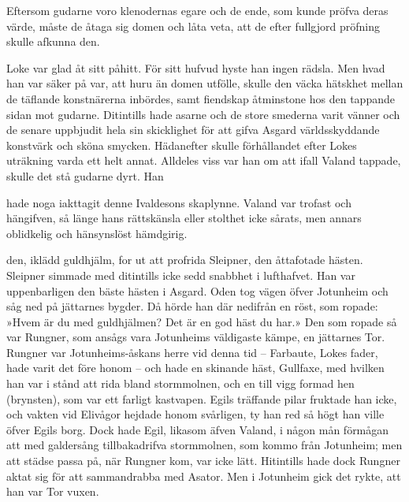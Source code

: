 Eftersom gudarne voro klenodernas egare och de ende, som kunde pröfva
deras värde, måste de åtaga sig domen och låta veta, att de efter
fullgjord pröfning skulle afkunna den.

Loke var glad åt sitt påhitt. För sitt hufvud hyste han ingen rädsla.
Men hvad han var säker på var, att huru än domen utfölle, skulle den
väcka hätskhet mellan de täflande konstnärerna inbördes, samt fiendskap
åtminstone hos den tappande sidan mot gudarne. Ditintills hade asarne
och de store smederna varit vänner och de senare uppbjudit hela sin
skicklighet för att gifva Asgard världsskyddande konstvärk och sköna
smycken. Hädanefter skulle förhållandet efter Lokes uträkning varda ett
helt annat. Alldeles viss var han om att ifall Valand tappade, skulle
det stå gudarne dyrt. Han

hade noga iakttagit denne Ivaldesons skaplynne. Valand var trofast och
hängifven, så länge hans rättskänsla eller stolthet icke sårats, men
annars oblidkelig och hänsynslöst hämdgirig.

\endSecII


\dropcapO den, iklädd guldhjälm, for ut att profrida Sleipner, den åttafotade
hästen. Sleipner simmade med ditintills icke sedd snabbhet i lufthafvet.
Han var uppenbarligen den bäste hästen i Asgard. Oden tog vägen öfver
Jotunheim och såg ned på jättarnes bygder. Då hörde han där nedifrån en
röst, som ropade: »Hvem är du med guldhjälmen? Det är en god häst du
har.» Den som ropade så var Rungner, som ansågs vara Jotunheims
väldigaste kämpe, en jättarnes Tor. Rungner var Jotunheims-åskans herre
vid denna tid -- Farbaute, Lokes fader, hade varit det före honom -- och
hade en skinande häst, Gullfaxe, med hvilken han var i stånd att rida
bland stormmolnen, och en till vigg formad hen (brynsten), som var ett
farligt kastvapen. Egils träffande pilar fruktade han icke, och vakten
vid Elivågor hejdade honom svårligen, ty han red så högt han ville öfver
Egils borg. Dock hade Egil, likasom äfven Valand, i någon mån förmågan
att med galdersång tillbakadrifva stormmolnen, som kommo från Jotunheim;
men att städse passa på, när Rungner kom, var icke lätt. Hitintills hade
dock Rungner aktat sig för att sammandrabba med Asator. Men i Jotunheim
gick det rykte, att han var Tor vuxen.

